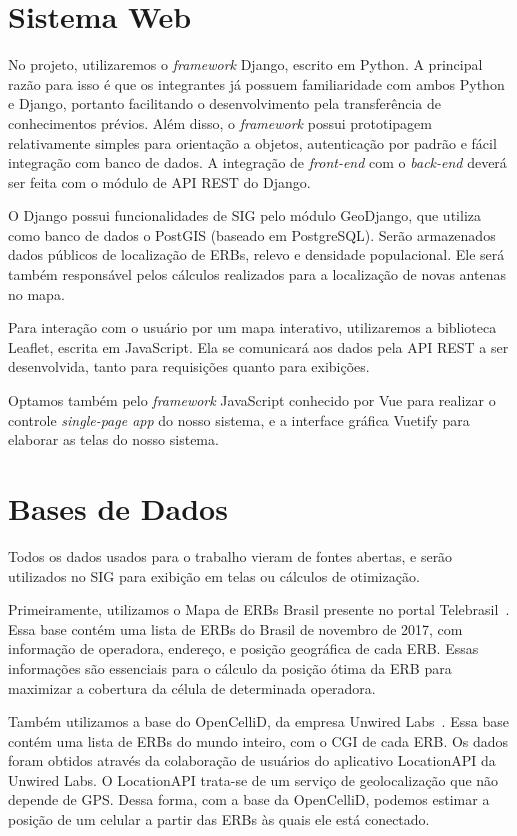 \documentclass[]{politex}
\begin{document}
\section{Sistema Web}

No projeto, utilizaremos o \textit{framework} Django, escrito em Python. A
principal razão para isso é que os integrantes já possuem familiaridade com
ambos Python e Django, portanto facilitando o desenvolvimento pela transferência
de conhecimentos prévios. Além disso, o \textit{framework} possui prototipagem
relativamente simples para orientação a objetos, autenticação por padrão e fácil
integração com banco de dados. A integração de \textit{front-end} com o
\textit{back-end} deverá ser feita com o módulo de API REST do Django.

O Django possui funcionalidades de SIG pelo módulo GeoDjango, que utiliza como
banco de dados o PostGIS (baseado em PostgreSQL). Serão armazenados
dados públicos de localização de ERBs, relevo e densidade populacional. Ele
será também responsável pelos cálculos realizados para a localização de novas
antenas no mapa.

Para interação com o usuário por um mapa interativo, utilizaremos a biblioteca
Leaflet, escrita em JavaScript. Ela se comunicará aos dados pela API REST a ser
desenvolvida, tanto para requisições quanto para exibições.

Optamos também pelo \textit{framework} JavaScript conhecido por Vue para realizar o
controle \emph{single-page app} do nosso sistema, e a interface gráfica Vuetify
para elaborar as telas do nosso sistema.

\section{Bases de Dados}

Todos os dados usados para o trabalho vieram de fontes abertas, e
serão utilizados no SIG para exibição em telas ou cálculos de otimização.

Primeiramente, utilizamos o Mapa de ERBs Brasil presente no portal Telebrasil~\cite{mapa-erb}.
Essa base contém uma lista de ERBs do Brasil de novembro de
2017, com informação de operadora, endereço, e posição geográfica de cada ERB.
Essas informações são essenciais para o cálculo da posição ótima da ERB para
maximizar a cobertura da célula de determinada operadora.

Também utilizamos a base do OpenCelliD, da empresa Unwired Labs~\cite{opencellid}.
Essa base contém uma lista de ERBs do mundo inteiro, com o
CGI de cada ERB. Os dados foram obtidos através da colaboração de usuários do
aplicativo LocationAPI da Unwired Labs. O LocationAPI trata-se de um serviço de
geolocalização que não depende de GPS. Dessa forma, com a base da OpenCelliD,
podemos estimar a posição de um celular a partir das ERBs às quais ele está
conectado.
\end{document}
